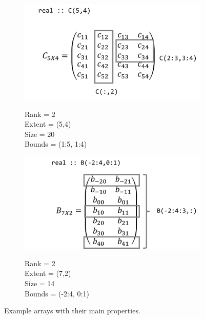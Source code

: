 \begin{figure}
    \begin{subfigure}[b]{0.5\textwidth}
        \centering
        \includegraphics[width = \textwidth]{./doc/Figures/Array1.png}  \\
        \begin{center}
            Rank = 2 \\
            Extent = (5,4) \\
            Size = 20 \\
            Bounds = (1:5, 1:4) \\
        \end{center}
    \end{subfigure}
    \hspace{\fill}
    \begin{subfigure}[b]{0.5\textwidth}
        \centering
        \includegraphics[width = \textwidth]{./doc/Figures/Array3.png}  \\
        \begin{center}
            Rank = 2 \\
            Extent = (7,2) \\
            Size = 14 \\
            Bounds = (-2:4, 0:1) \\
        \end{center}
    \end{subfigure}
    \caption{Example arrays with their main properties.}   \label{fig:arrays}
\end{figure}







